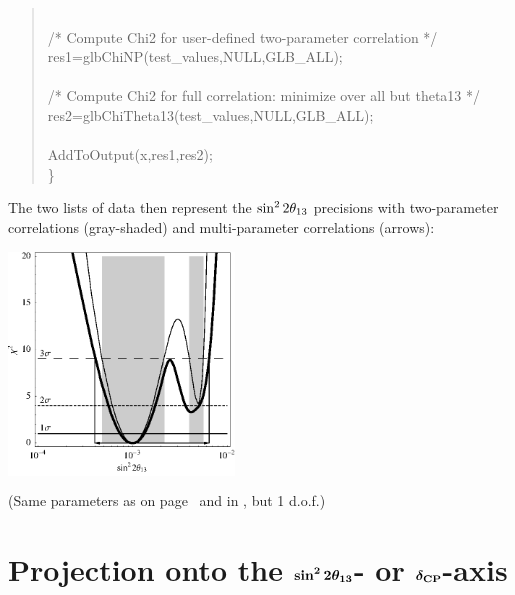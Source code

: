 {\begin{quote}
{{ \\
\hspace*{0.5cm} /* Compute Chi2 for user-defined two-parameter correlation */ \\
\hspace*{0.5cm} res1=glbChiNP(test\_values,NULL,GLB\_ALL); \\
      \\
\hspace*{0.5cm} /* Compute Chi2 for full correlation: minimize over all but theta13 */ \\
\hspace*{0.5cm} res2=glbChiTheta13(test\_values,NULL,GLB\_ALL); \\
  \\
\hspace*{0.5cm} AddToOutput(x,res1,res2);\\
  \} \\
  
}}
\end{quote}
The two lists of data then represent the $\stheta$ precisions with two-parameter correlations (gray-shaded) and multi-parameter correlations (arrows):
\begin{center}
\colorbox{white}{\includegraphics[width=6cm]{projallex}}

\vspace*{0.1cm}

\footnotesize{(Same parameters as on page~\pageref{ex:corrth13dcp} and in , but 1 d.o.f.)}
\end{center}
}
\section[Projection onto the $\stheta$-axis or $\deltacp$-axis]{Projection onto the $\boldsymbol{\sin^2 2 \theta_{13}}$- or $\boldsymbol{\delta_{\mathrm{CP}}}$-axis}

